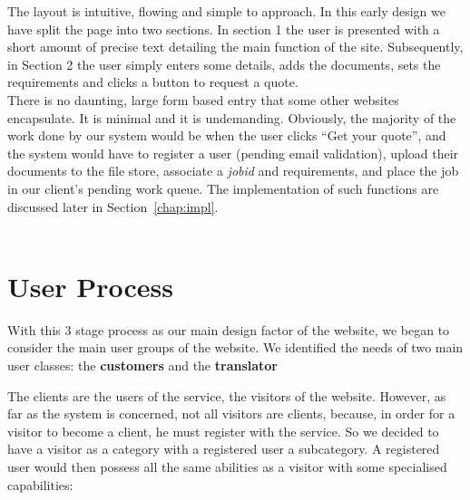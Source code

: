 \documentclass{l3proj}
\begin{document}
The layout is intuitive, flowing and simple to approach. In this early design we have split the page into two sections. In section 1 the user is presented with a short amount of precise text detailing the main function of the site. Subsequently, in Section 2 the user simply enters some details, adds the documents, sets the requirements and clicks a button to request a quote. \\There is no daunting, large form based entry that some other websites encapsulate. It is minimal and it is undemanding. Obviously, the majority of the work done by our system would be when the user clicks ``Get your quote'', and the system would have to register a user (pending email validation), upload their documents to the file store, associate a \textit{jobid} and requirements, and place the job in our client's pending work queue. The implementation of such functions are discussed later in Section~\ref{chap:impl}.\\
\\


\section{User Process}
With this 3 stage process as our main design factor of the website, we began to consider the main user groups of the website. We identified the needs of two main user classes: the \textbf{customers} and the \textbf{translator}

The clients are the users of the service, the visitors of the website. However, as far as the system is concerned, not all visitors are clients, because, in order for a visitor to become a client, he must register with the service. So we decided to have a visitor as a category with a registered user a subcategory. A registered user would then possess all the same abilities as a visitor with some specialised capabilities:
\end{document}
